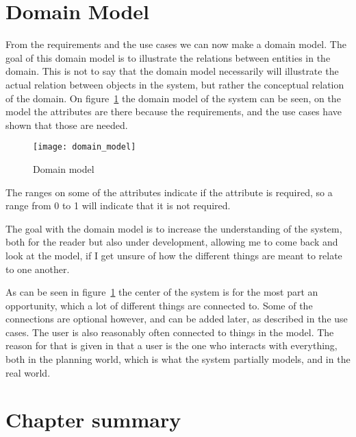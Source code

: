 \section{Domain Model}
\label{sec:Domain Model}
From the requirements and the use cases we can now make a domain model. The goal of this domain model is to illustrate the relations between entities in the domain\cite{larman}. This is not to say that the domain model necessarily will illustrate the actual relation between objects in the system, but rather the conceptual relation of the domain. On figure~\ref{fig:domain_model} the domain model of  the system can be seen, on the model the attributes are there because the requirements, and the use cases have shown that those are needed.

\begin{figure}[h]
  \centering
  \texttt{[image: domain\_model]}
  \caption{Domain model}
  \label{fig:domain_model}
\end{figure}

The ranges on some of the attributes indicate if the attribute is required, so a range from 0 to 1 will indicate that it is not required.

The goal with the domain model is to increase the understanding of the system, both for the reader but also under development, allowing me to come back and look at the model, if I get unsure of how the different things are meant to relate to one another.

As can be seen in figure~\ref{fig:domain_model} the center of the system is for the most part an opportunity, which a lot of different things are connected to. Some of the connections are optional however, and can be added later, as described in the use cases. The user is also reasonably often connected to things in the model. The reason for that is given in that a user is the one who interacts with everything, both in the planning world, which is what the system partially models, and in the real world.

\section{Chapter summary}
